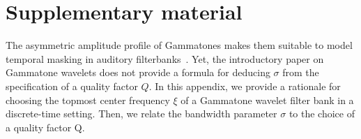 \documentclass[smallextended]{svjour3}
\begin{document}
%









\section{Supplementary material}

The asymmetric amplitude profile of Gammatones makes them suitable to model temporal masking in auditory filterbanks~\cite{Fastl2007}.
Yet, the introductory paper on Gammatone wavelets \cite{Venkitaraman2014} does not provide a formula for deducing $\sigma$ from the specification of a quality factor $Q$.
In this appendix, we provide a rationale for choosing the topmost center frequency $\xi$ of a Gammatone wavelet filter bank in a discrete-time setting. Then, we relate the bandwidth parameter $\sigma$ to the choice of a quality factor Q.
\end{document}
